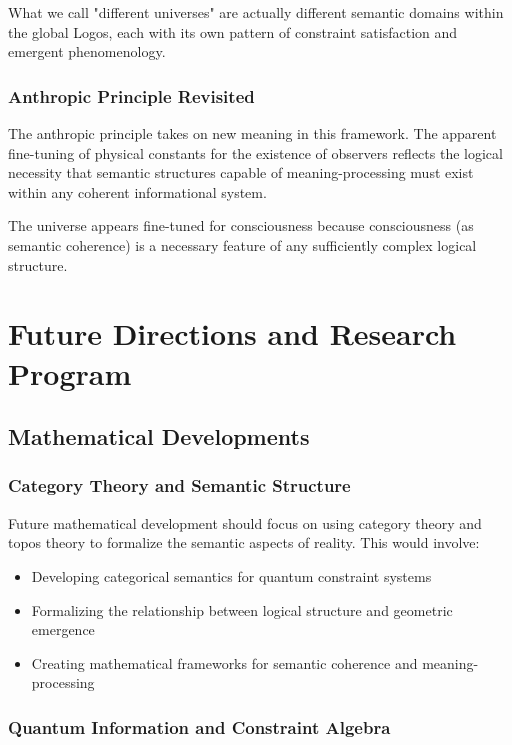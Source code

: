 \documentclass[12pt,a4paper]{article}
\begin{document}
What we call "different universes" are actually different semantic domains within the global Logos, each with its own pattern of constraint satisfaction and emergent phenomenology.

\subsubsection{Anthropic Principle Revisited}

The anthropic principle takes on new meaning in this framework. The apparent fine-tuning of physical constants for the existence of observers reflects the logical necessity that semantic structures capable of meaning-processing must exist within any coherent informational system.

The universe appears fine-tuned for consciousness because consciousness (as semantic coherence) is a necessary feature of any sufficiently complex logical structure.

\section{Future Directions and Research Program}

\subsection{Mathematical Developments}

\subsubsection{Category Theory and Semantic Structure}

Future mathematical development should focus on using category theory and topos theory to formalize the semantic aspects of reality. This would involve:

\begin{itemize}
    \item Developing categorical semantics for quantum constraint systems
    \item Formalizing the relationship between logical structure and geometric emergence
    \item Creating mathematical frameworks for semantic coherence and meaning-processing
\end{itemize}

\subsubsection{Quantum Information and Constraint Algebra}
\end{document}
